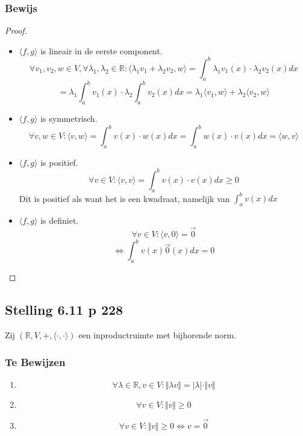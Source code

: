 \documentclass[lineaire_algebra_oplossingen.tex]{subfiles}
\begin{document}
\subsubsection*{Bewijs}
\begin{proof}
\begin{itemize}
\item $\langle f,g\rangle$ is lineair in de eerste component.
\[
\forall v_1,v_2,w\in V, \forall \lambda_1,\lambda_2 \in \mathbb{R}:
\langle \lambda_1v_1+\lambda_2v_2,w\rangle = \int_a^b\lambda_1 v_1(x)\cdot \lambda_2 v_2(x)dx
\]
\[
= \lambda_1\int_a^b v_1(x)\cdot \lambda_2\int_a^b v_2(x)dx = \lambda_1\langle v_1,w\rangle + \lambda_2\langle v_2,w\rangle
\]

\item $\langle f,g\rangle$ is symmetrisch.
\[
\forall v,w\in V: \langle v,w\rangle = \int_a^bv(x)\cdot w(x)dx= \int_a^bw(x)\cdot v(x)dx = \langle w,v\rangle
\]

\item $\langle f,g\rangle$ is positief.
\[
\forall v\in V: \langle v,v\rangle = \int_a^bv(x)\cdot v(x)dx \ge 0
\]
Dit is positief als want het is een kwadraat, namelijk van $\int_a^bv(x)dx$

\item $\langle f,g\rangle$ is definiet.
\[
\forall v\in V: \langle v,0\rangle = \vec{0}
\]
\[
\Leftrightarrow \int_a^bv(x)\vec{0}(x) dx = 0
\]
\end{itemize}
\end{proof}


\subsection{Stelling 6.11 p 228}
\label{6.11}
Zij $(\mathbb{R},V,+,\langle\cdot,\cdot\rangle)$ een inproductruimte met bijhorende norm.

\subsubsection*{Te Bewijzen}
\begin{enumerate}
\item 
\[
\forall \lambda\in\mathbb{R}, v\in V: \Vert\lambda v\Vert = \vert\lambda\vert\cdot \Vert v\Vert
\]

\item
\[
\forall v\in V: \Vert v\Vert\ge 0
\]

\item
\[
\forall v\in V: \Vert v\Vert\ge 0 \Leftrightarrow v=\vec{0}
\]
\end{enumerate}
\end{document}
